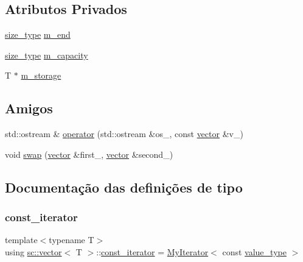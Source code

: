 \subsection*{Atributos Privados}
\begin{DoxyCompactItemize}
\item 
\hyperlink{classsc_1_1vector_a48bf37ba1a6d0c13504414d86e27c399}{size\+\_\+type} \hyperlink{classsc_1_1vector_a6975f68db056a83f00912e9f986ca084}{m\+\_\+end}
\item 
\hyperlink{classsc_1_1vector_a48bf37ba1a6d0c13504414d86e27c399}{size\+\_\+type} \hyperlink{classsc_1_1vector_a566372683113653e90132001ddec8baa}{m\+\_\+capacity}
\item 
T $\ast$ \hyperlink{classsc_1_1vector_a1703231d2a20b42fd2814962310baf1d}{m\+\_\+storage}
\end{DoxyCompactItemize}
\subsection*{Amigos}
\begin{DoxyCompactItemize}
\item 
std\+::ostream \& \hyperlink{classsc_1_1vector_a889e37c4415a33fb90d8b564bf428e24}{operator} (std\+::ostream \&os\+\_\+, const \hyperlink{classsc_1_1vector}{vector} \&v\+\_\+)
\item 
void \hyperlink{classsc_1_1vector_a9198beeb05f24ba2eadccab0a606063c}{swap} (\hyperlink{classsc_1_1vector}{vector} \&first\+\_\+, \hyperlink{classsc_1_1vector}{vector} \&second\+\_\+)
\end{DoxyCompactItemize}


\subsection{Documentação das definições de tipo}
\mbox{\label{classsc_1_1vector_a1e50aa429ea9de6ead4bfdb8614c1c9a}} 
\subsubsection{\texorpdfstring{const\+\_\+iterator}{const\_iterator}}
{\footnotesize\ttfamily template$<$typename T$>$ \\
using \hyperlink{classsc_1_1vector}{sc\+::vector}$<$ T $>$\+::\hyperlink{classsc_1_1vector_a1e50aa429ea9de6ead4bfdb8614c1c9a}{const\+\_\+iterator} =  \hyperlink{classsc_1_1MyIterator}{My\+Iterator}$<$ const \hyperlink{classsc_1_1vector_ad37f5bfa688e43c420ed565e4bff6fac}{value\+\_\+type} $>$}




